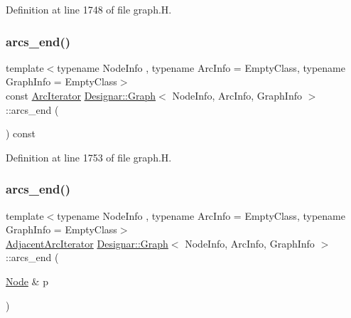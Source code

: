 Definition at line 1748 of file graph.\+H.

\mbox{\label{class_designar_1_1_graph_a81269c52d854ceb3d000f2642fcb52ae}} 
\subsubsection{\texorpdfstring{arcs\+\_\+end()}{arcs\_end()}\hspace{0.1cm}{\footnotesize\ttfamily [2/4]}}
{\footnotesize\ttfamily template$<$typename Node\+Info , typename Arc\+Info  = Empty\+Class, typename Graph\+Info  = Empty\+Class$>$ \\
const \hyperlink{class_designar_1_1_graph_1_1_arc_iterator}{Arc\+Iterator} \hyperlink{class_designar_1_1_graph}{Designar\+::\+Graph}$<$ Node\+Info, Arc\+Info, Graph\+Info $>$\+::arcs\+\_\+end (\begin{DoxyParamCaption}{ }\end{DoxyParamCaption}) const\hspace{0.3cm}{\ttfamily [inline]}}



Definition at line 1753 of file graph.\+H.

\mbox{\label{class_designar_1_1_graph_a68ee235ab79790c00e1a69d518b9c076}} 
\subsubsection{\texorpdfstring{arcs\+\_\+end()}{arcs\_end()}\hspace{0.1cm}{\footnotesize\ttfamily [3/4]}}
{\footnotesize\ttfamily template$<$typename Node\+Info , typename Arc\+Info  = Empty\+Class, typename Graph\+Info  = Empty\+Class$>$ \\
\hyperlink{class_designar_1_1_graph_1_1_adjacent_arc_iterator}{Adjacent\+Arc\+Iterator} \hyperlink{class_designar_1_1_graph}{Designar\+::\+Graph}$<$ Node\+Info, Arc\+Info, Graph\+Info $>$\+::arcs\+\_\+end (\begin{DoxyParamCaption}\item[{\hyperlink{class_designar_1_1_graph_a5dfc7dba9d092ac489c72e40390c37d0}{Node} \&}]{p }\end{DoxyParamCaption})\hspace{0.3cm}{\ttfamily [inline]}}




